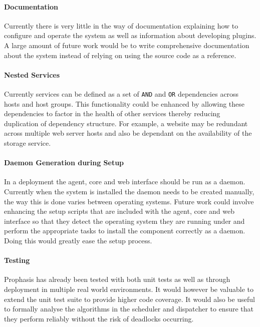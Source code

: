 \documentclass[bsc,deptreport,twoside,parskip,singlespacing,notimes]{infthesis}
\begin{document}
\paragraph*{Documentation}
	Currently there is very little in the way of documentation explaining how to
	configure and operate the system as well as information about developing
	plugins.  A large amount of future work would be to write comprehensive
	documentation about the system instead of relying on using the source code as a
	reference.

\paragraph*{Nested Services}
	Currently services can be defined as a set of \texttt{AND} and \texttt{OR}
	dependencies across hosts and host groups.  This functionality could be
 	enhanced by allowing these dependencies to factor in the health of other
 	services thereby reducing duplication of dependency structure.  For example,
 	a website may be redundant across multiple web server hosts and also be
 	dependant on the availability of the storage service.

\paragraph*{Daemon Generation during Setup}
	In a deployment the agent, core and web interface should be run as a daemon.
	Currently when the system is installed the daemon needs to be created manually,
	the way this is done varies between operating systems. Future work could
	involve enhancing the setup scripts that are included with the agent, core and
	web interface so that they detect the operating system they are running under
	and perform the appropriate tasks to install the component correctly as a
	daemon.  Doing this would greatly ease the setup process.
	
\paragraph*{Testing}
	Prophasis has already been tested with both unit tests as well as through
	deployment in multiple real world environments.  It would however be valuable
	to extend the unit test suite to provide higher code coverage.  It would also
	be useful to formally analyse the algorithms in the scheduler and dispatcher
	to ensure that they perform reliably without the risk of deadlocks occurring.

\end{document}
